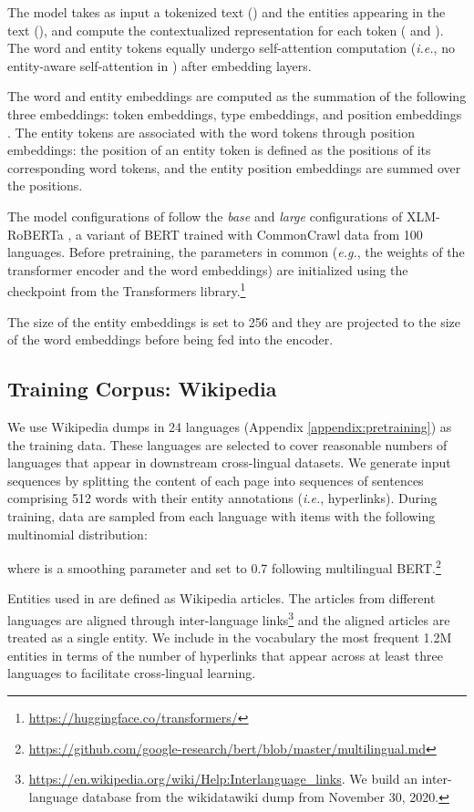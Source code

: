 \documentclass[11pt]{article}
\newcommand{\minisection}[1]{\noindent{\bf {#1}.}}
\newcommand{\Appendix}[1]{Appendix \ref{#1}}
\begin{document}
The model takes as input a tokenized text () and the entities appearing in the text (), and compute the contextualized representation for each token ( and ).
The word and entity tokens equally undergo self-attention computation ({\it i.e.}, no entity-aware self-attention in \citet{yamada-etal-2020-luke}) after embedding layers.

The word and entity embeddings are computed as the summation of the following three embeddings: token embeddings, type embeddings, and position embeddings \citep{devlin2018bert}.
The entity tokens are associated with the word tokens through position embeddings:
the position of an entity token is defined as the positions of its corresponding word tokens, and the entity position embeddings are summed over the positions.

\minisection{Model Configuration}
The model configurations of \mluke{} follow the {\it base} and {\it large} configurations of XLM-RoBERTa \citep{conneau-etal-2020-unsupervised}, a variant of BERT \citep{devlin2018bert} trained with CommonCrawl data from 100 languages.
Before pretraining, the parameters in common ({\it e.g.}, the weights of the transformer encoder and the word embeddings) are initialized using the checkpoint from the Transformers library.\footnote{\url{https://huggingface.co/transformers/}}

The size of the entity embeddings is set to 256 and they are projected to the size of the word embeddings before being fed into the encoder.

\subsection{Training Corpus: Wikipedia}
We use Wikipedia dumps in 24 languages (\Appendix{appendix:pretraining}) as the training data.
These languages are selected to cover reasonable numbers of languages that appear in downstream cross-lingual datasets.
We generate input sequences by splitting the content of each page into sequences of sentences comprising  512 words with their entity annotations ({\it i.e.}, hyperlinks).
During training, data are sampled from each language with  items with the following multinomial distribution:



\noindent
where  is a smoothing parameter and set to 0.7 following multilingual BERT.\footnote{\url{https://github.com/google-research/bert/blob/master/multilingual.md}}

\minisection{Entity Vocabulary}
Entities used in \mluke{} are defined as Wikipedia articles.
The articles from different languages are aligned through inter-language links\footnote{\url{https://en.wikipedia.org/wiki/Help:Interlanguage_links}. We build an inter-language database from the wikidatawiki dump from November 30, 2020.} and the aligned articles are treated as a single entity.
We include in the vocabulary the most frequent 1.2M entities in terms of the number of hyperlinks that appear across at least three languages to facilitate cross-lingual learning.
\end{document}
